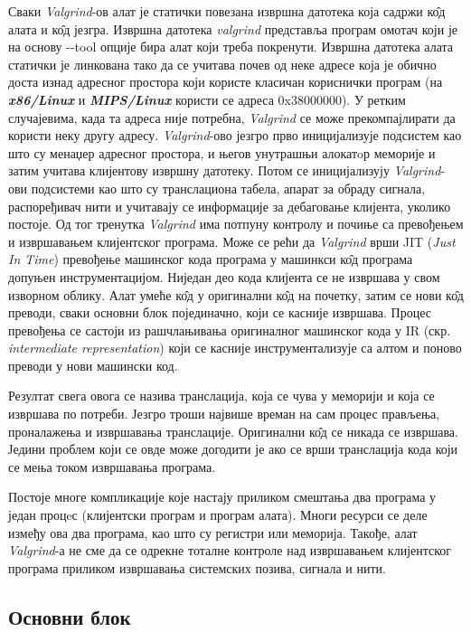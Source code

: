 \documentclass[12pt,oneside]{memoir}
\begin{document}
\indent Сваки \textit{Valgrind}-ов алат је статички повезана извршна датотека која садржи к\^{о}д алата и к\^{о}д језгра. Извршна датотека \textit{valgrind} представља програм омотач који је на основу -\--tool опције бира алат који треба покренути. Извршна датотека алата статички је линкована тако да се учитава почев од неке адресе која је обично доста изнад адресног простора који користе класичан кориснички програм (на \textbf{\textit{x86/Linux}} и \textbf{\textit{MIPS/Linux}} користи се адреса 0x38000000). У ретким случајевима, када та адреса није потребна, \textit{Valgrind} се може прекомпајлирати да користи неку другу адресу. \textit{Valgrind}-ово језгро прво иницијализује подсистем као што су менаџер адресног простора, и његов унутрашњи алокатoр меморије и затим учитава клијентову извршну датотеку. Потом се иницијализују \textit{Valgrind}-ови подсистеми као што су транслациона табела, апарат за обраду сигнала, распоређивач нити и учитавају се информације за дебаговање клијента, уколико постоје. Од тог тренутка \textit{Valgrind} има потпуну контролу и почиње са превођењем и извршавањем клијентског програма. Може се рећи да \textit{Valgrind} врши JIT (\textit{Just In Time}) превођење машинског кода програма у машинкси к\^{о}д програма допуњен инструментацијом. Ниједан део кода клијента се не извршава у свом изворном облику. Алат умеће к\^{о}д у оригинални к\^{о}д на почетку, затим се нови к\^{о}д преводи, сваки основни блок појединачно, који се касније извршава. Процес превођења се састоји из рашчлањивања оригиналног машинског кода у IR (скр. \textit{intermediate representation}) који се касније инструментализује са алтом и поново преводи у нови машински код. 

\indent Резултат свега овога се назива транслација, која се чува у меморији и која се извршава по потреби. Језгро троши највише времан на сам процес прављења, проналажења и извршавања транслације. Оригинални к\^{о}д се никада се извршава. Једини проблем који се овде може догодити је ако се врши транслација кода који се мења током извршавања програма.

\indent Постоје многе компликације које настају приликом смештања два програма у један процeс (клијентски програм и програм алата). Многи ресурси се деле између ова два програма, као што су регистри или меморија. Такође, алат \textit{Valgrind}-а не сме да се одрекне тоталне контроле над извршавањем клијентског програма приликом извршавања системских позива, сигнала и нити.

\subsection{Основни блок}
\end{document}
